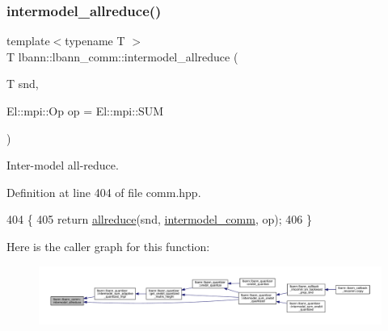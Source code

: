 \subsubsection{\texorpdfstring{intermodel\+\_\+allreduce()}{intermodel\_allreduce()}\hspace{0.1cm}{\footnotesize\ttfamily [1/2]}}
{\footnotesize\ttfamily template$<$typename T $>$ \\
T lbann\+::lbann\+\_\+comm\+::intermodel\+\_\+allreduce (\begin{DoxyParamCaption}\item[{T}]{snd,  }\item[{El\+::mpi\+::\+Op}]{op = {\ttfamily El\+:\+:mpi\+:\+:SUM} }\end{DoxyParamCaption})\hspace{0.3cm}{\ttfamily [inline]}}

Inter-\/model all-\/reduce. 

Definition at line 404 of file comm.\+hpp.


\begin{DoxyCode}
404                                                        \{
405     \textcolor{keywordflow}{return} \hyperlink{classlbann_1_1lbann__comm_af5631e5f0f54e4df4958eba9df2599ef}{allreduce}(snd, \hyperlink{classlbann_1_1lbann__comm_a2c51c5d8faf4f0ab4f43b892c55e597b}{intermodel\_comm}, op);
406   \}
\end{DoxyCode}
Here is the caller graph for this function\+:\nopagebreak
\begin{figure}[H]
\begin{center}
\leavevmode
\includegraphics[width=350pt]{classlbann_1_1lbann__comm_a502bd724f9fb27f0e899306c69a3ec47_icgraph}
\end{center}
\end{figure}
\mbox{\label{classlbann_1_1lbann__comm_a34d5414f1ac4749e6f0937b638bb5cc6}} 
